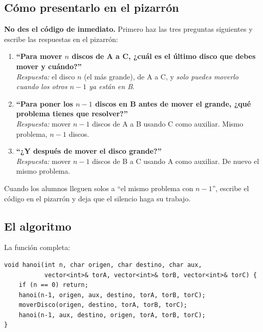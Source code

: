 \documentclass[12pt, oneside]{article}
\begin{document}
\subsection{Cómo presentarlo en el pizarrón}

\textbf{No des el código de inmediato.}  Primero haz las tres preguntas
siguientes y escribe las respuestas en el pizarrón:

\begin{notaprofesor}
  \begin{enumerate}
    \item \textbf{``Para mover $n$ discos de A a C, ¿cuál es el último
          disco que debes mover y cuándo?''}\\
          \textit{Respuesta:} el disco $n$ (el más grande), de A a C,
          y \textit{solo puedes moverlo cuando los otros $n-1$ ya están en B}.

    \item \textbf{``Para poner los $n-1$ discos en B antes de mover el
          grande, ¿qué problema tienes que resolver?''}\\
          \textit{Respuesta:} mover $n-1$ discos de A a B usando C como
          auxiliar.  Mismo problema, $n-1$ discos.

    \item \textbf{``¿Y después de mover el disco grande?''}\\
          \textit{Respuesta:} mover $n-1$ discos de B a C usando A
          como auxiliar.  De nuevo el mismo problema.
  \end{enumerate}

  Cuando los alumnos lleguen solos a ``el mismo problema con $n-1$'',
  escribe el código en el pizarrón y deja que el silencio haga su trabajo.
\end{notaprofesor}

\subsection{El algoritmo}

La función completa:

\begin{verbatim}
void hanoi(int n, char origen, char destino, char aux,
           vector<int>& torA, vector<int>& torB, vector<int>& torC) {
    if (n == 0) return;
    hanoi(n-1, origen, aux, destino, torA, torB, torC);
    moverDisco(origen, destino, torA, torB, torC);
    hanoi(n-1, aux, destino, origen, torA, torB, torC);
}
\end{verbatim}
\end{document}
